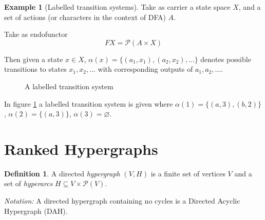 \documentclass[12pt]{article}
\theoremstyle{definition}
\newtheorem{definition}[theorem]{Definition}
\newtheorem{example}[theorem]{Example}
\renewcommand{\P}{\mathcal{P}}
\newcommand{\1}{\mathbbm{1}}
\begin{document}
\begin{example}[Labelled transition systems]
    Take as carrier a state space $X$, and a set of actions (or characters in the context of DFA) $A$.

    Take as endofunctor 
    \[
        FX = \P(A\times X)
    \]

    Then given a state $x\in X$, $\alpha(x) = \{(a_1, x_1),(a_2, x_2), \dots\}$ denotes possible transitions to states $x_1, x_2, \dots$ with corresponding outputs of $a_1, a_2, \dots$.
    \begin{figure}[h]
        \centering
        \label{ex-lab_tran_sys}
        \caption{A labelled transition system}
    \end{figure}

    In figure \ref{ex-lab_tran_sys} a labelled transition system is given where $\alpha(1) = \{(a,3),(b,2)\}$, $\alpha(2) = \{(a,3)\}$, $\alpha(3) = \varnothing$.
\end{example}

\newpage
\section{Ranked Hypergraphs}
\begin{definition}
    A directed \emph{hypergraph} $(V,H)$ is a finite set of vertices $V$ and a set of \emph{hyperarcs} $H\subseteq V\times\P(V)$.
\end{definition}

\emph{Notation:} A directed hypergraph containing no cycles is a Directed Acyclic Hypergraph (DAH).
\end{document}
